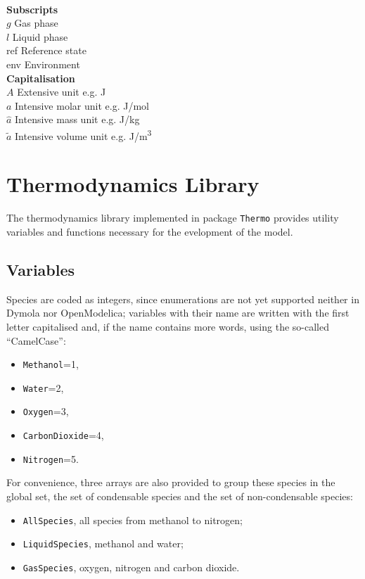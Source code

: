 \documentclass[a4paper]{article}
\begin{document}
\begin{multicols}{2}
\begin{tabbing}
\\\textbf{Subscripts}\\
$g$ \> Gas phase\\
$l$ \> Liquid phase\\
ref \> Reference state\\
env \> Environment\\
\textbf{Capitalisation}\\
$A$ \> Extensive unit \> e.g. J\\
$a$ \> Intensive molar unit \> e.g. J/mol\\
$\hat a$ \> Intensive mass unit \> e.g. J/kg\\
$\tilde a$ \> Intensive volume unit \> e.g. J/m\textsuperscript{3}
\end{tabbing}
\end{multicols}


\section{Thermodynamics Library}
The thermodynamics library implemented in package \texttt{Thermo} provides
utility variables and functions necessary for the evelopment of the model.

\subsection{Variables}
Species are coded as integers, since enumerations are not yet supported neither
in Dymola nor OpenModelica; variables with their name are written with the first
letter capitalised and, if the name contains more words, using the so-called
``CamelCase'':

\begin{itemize}
\item \texttt{Methanol}=1,
\item \texttt{Water}=2,
\item \texttt{Oxygen}=3,
\item \texttt{CarbonDioxide}=4,
\item \texttt{Nitrogen}=5.
\end{itemize}

For convenience, three arrays are also provided to group these species in the
global set, the set of condensable species and the set of non-condensable
species:

\begin{itemize}
\item \texttt{AllSpecies}, all species from methanol to nitrogen;
\item \texttt{LiquidSpecies}, methanol and water;
\item \texttt{GasSpecies}, oxygen, nitrogen and carbon dioxide.
\end{itemize}
\end{document}
